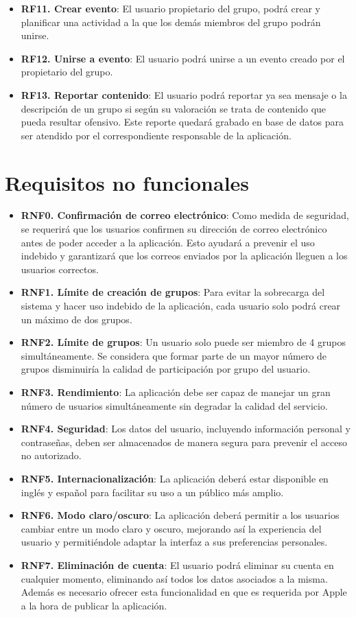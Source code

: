 \begin{itemize}
            \item \textbf{RF11. Crear evento}: El usuario propietario del grupo, podrá crear y planificar una actividad a la que los demás miembros del grupo podrán unirse.
            \item \textbf{RF12. Unirse a evento}: El usuario podrá unirse a un evento creado por el propietario del grupo.
            \item \textbf{RF13. Reportar contenido}: El usuario podrá reportar ya sea mensaje o la descripción de un grupo si según su valoración se trata de contenido que pueda resultar ofensivo. Este reporte quedará grabado en base de datos para ser atendido por el correspondiente responsable de la aplicación.
        \end{itemize}

    \section{Requisitos no funcionales}
        \begin{itemize}
        \item \textbf{RNF0. Confirmación de correo electrónico}: Como medida de seguridad, se requerirá que los usuarios confirmen su dirección de correo electrónico antes de poder acceder a la aplicación. Esto ayudará a prevenir el uso indebido y garantizará que los correos enviados por la aplicación lleguen a los usuarios correctos.
        \item \textbf{RNF1. Límite de creación de grupos}: Para evitar la sobrecarga del sistema y hacer uso indebido de la aplicación, cada usuario solo podrá crear un máximo de dos grupos.
        \item \textbf{RNF2. Límite de grupos}: Un usuario solo puede ser miembro de 4 grupos simultáneamente. Se considera que formar parte de un mayor número de grupos disminuiría la calidad de participación por grupo del usuario.
        \item \textbf{RNF3. Rendimiento}: La aplicación debe ser capaz de manejar un gran número de usuarios simultáneamente sin degradar la calidad del servicio.
        \item \textbf{RNF4. Seguridad}: Los datos del usuario, incluyendo información personal y contraseñas, deben ser almacenados de manera segura para prevenir el acceso no autorizado.
        \item \textbf{RNF5. Internacionalización}: La aplicación deberá estar disponible en inglés y español para facilitar su uso a un público más amplio.
        \item \textbf{RNF6. Modo claro/oscuro}: La aplicación deberá permitir a los usuarios cambiar entre un modo claro y oscuro, mejorando así la experiencia del usuario y permitiéndole adaptar la interfaz a sus preferencias personales.
        \item \textbf{RNF7. Eliminación de cuenta}: El usuario podrá eliminar su cuenta en cualquier momento, eliminando así todos los datos asociados a la misma. Además es necesario ofrecer esta funcionalidad en que es requerida por Apple \cite{REF9} a la hora de publicar la aplicación.

    \end{itemize}